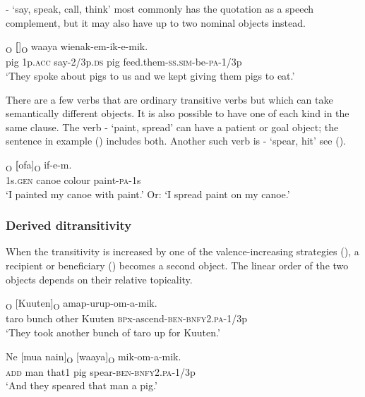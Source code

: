 - `say, speak, call, think' most commonly has the quotation as a speech complement, but it may also have up to two nominal objects instead.

\ea%
\label{ex:x956}
\textsubscript{O}  \textbf{[}]\textsubscript{O}    waaya  wienak-em-ik-e-mik. \\
     pig  1p.\textsc{acc}  say-2/3p.\textsc{ds}  pig  feed.them-\textsc{ss}.\textsc{sim}-be-\textsc{pa}-1/3p \\
\glt `They spoke about pigs to us and we kept giving them pigs to eat.'
\z

There are a few verbs that are ordinary transitive verbs but which can take semantically different objects. It is also possible to have one of each kind in the same clause. The verb - `paint, spread' can have a patient or goal object; the sentence in example () includes both. Another such verb is \nobreakdash- `spear, hit' see ().  

\ea%
\label{ex:x944}
\textsubscript{O}  \textbf{[}ofa]\textsubscript{O}  if-e-m. \\
     1s.\textsc{gen}  canoe  colour  paint-\textsc{pa}-1s \\
\glt `I painted my canoe with paint.' Or: `I spread paint on my canoe.'
\z

\subsubsection[Derived ditransitivity ]{Derived ditransitivity} 
\hypertarget{RefHeading22041935131865}{}
When the transitivity is increased by one of the valence-increasing strategies (), a recipient or beneficiary () becomes a second object. The linear order of the two objects depends on their relative topicality.

\ea%
\label{ex:x947}
\textsubscript{O}  [Kuuten]\textsubscript{O}  amap-urup-om-a-mik. \\
     taro  bunch  other  Kuuten  \textsc{bp}x-ascend-\textsc{ben}-\textsc{bnfy}2.\textsc{pa}-1/3p \\
\glt `They took another bunch of taro up for Kuuten.'
\z

\ea%
\label{ex:x1840}
\gll Ne  [mua  nain]\textsubscript{O}  [waaya]\textsubscript{O}  mik-om-a-mik. \\
     \textsc{add}  man  that1  pig  spear-\textsc{ben}-\textsc{bnfy}2.\textsc{pa}-1/3p \\
\glt `And they speared that man a pig.'
\z

